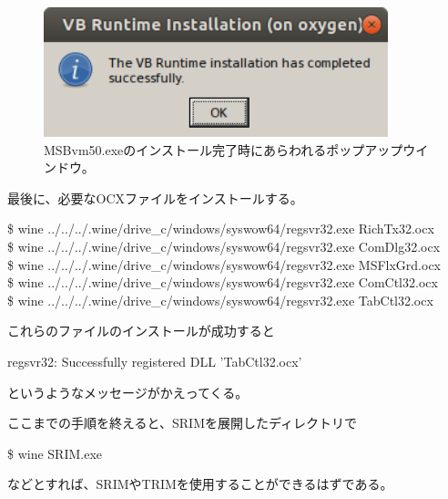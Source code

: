 \documentclass [11pt,a4paper,dvipdfmx] {jarticle}
\begin{document}
\begin{figure}[H]
    \centering
    \includegraphics[width=10cm]{./pic/VB_runtime_done.png}
    \caption{MSBvm50.exeのインストール完了時にあらわれるポップアップウインドウ。}
    \label{fig:VB_done}
\end{figure}


最後に、必要なOCXファイルをインストールする。
\begin{screen}[4]
    \$ wine ../../../.wine/drive\_c/windows/syswow64/regsvr32.exe RichTx32.ocx \\
    \$ wine ../../../.wine/drive\_c/windows/syswow64/regsvr32.exe ComDlg32.ocx  \\
    \$ wine ../../../.wine/drive\_c/windows/syswow64/regsvr32.exe MSFlxGrd.ocx \\
    \$ wine ../../../.wine/drive\_c/windows/syswow64/regsvr32.exe ComCtl32.ocx \\
    \$ wine ../../../.wine/drive\_c/windows/syswow64/regsvr32.exe TabCtl32.ocx 
\end{screen}
これらのファイルのインストールが成功すると
\begin{screen}[4]
    regsvr32: Successfully registered DLL 'TabCtl32.ocx'
\end{screen}
というようなメッセージがかえってくる。

ここまでの手順を終えると、SRIMを展開したディレクトリで
\begin{screen}[4]
    \$ wine SRIM.exe
\end{screen}
などとすれば、SRIMやTRIMを使用することができるはずである。


\end{document}
